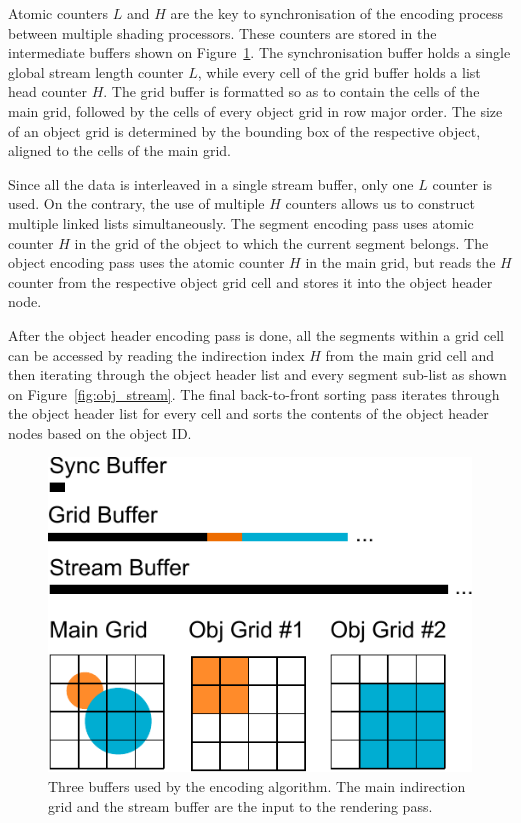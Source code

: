 \documentclass[11pt,a4paper,twoside]{article}
\begin{document}
Atomic counters $L$ and $H$ are the key to synchronisation of the encoding process between multiple shading processors. These counters are stored in the intermediate buffers shown on Figure~\ref{fig:data_buffers}. The synchronisation buffer holds a single global stream length counter $L$, while every cell of the grid buffer holds a list head counter $H$. The grid buffer is formatted so as to contain the cells of the main grid, followed by the cells of every object grid in row major order. The size of an object grid is determined by the bounding box of the respective object, aligned to the cells of the main grid.

Since all the data is interleaved in a single stream buffer, only one $L$ counter is used. On the contrary, the use of multiple $H$ counters allows us to construct multiple linked lists simultaneously. The segment encoding pass uses atomic counter $H$ in the grid of the object to which the current segment belongs. The object encoding pass uses the atomic counter $H$ in the main grid, but reads the $H$ counter from the respective object grid cell and stores it into the object header node.

After the object header encoding pass is done, all the segments within a grid cell can be accessed by reading the indirection index $H$ from the main grid cell and then iterating through the object header list and every segment sub-list as shown on Figure~\ref{fig:obj_stream}. The final back-to-front sorting pass iterates through the object header list for every cell and sorts the contents of the object header nodes based on the object ID.

\begin {figure}
	\centering
	\includegraphics[width=0.5\columnwidth] {figures/data_buffers}
	\caption {Three buffers used by the encoding algorithm. The main indirection grid and the stream buffer are the input to the rendering pass.}
	\label {fig:data_buffers}
\end {figure}

\end{document}
